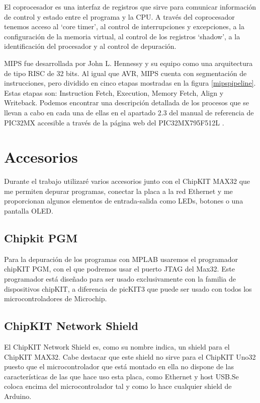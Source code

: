 El coprocesador es una interfaz de registros que sirve para comunicar información de control y estado entre el programa y la CPU. A través del coprocesador tenemos acceso al `core timer', al control de interrupciones y excepciones, a la configuración de la memoria virtual, al control de los registros `shadow', a la identificación del procesador y al control de depuración.


MIPS fue desarrollada por John L. Hennessy y su equipo como una arquitectura de tipo RISC de 32 bits. Al igual que AVR, MIPS cuenta con segmentación de instrucciones, pero dividido en cinco etapas mostradas en la figura \ref{mipspipeline}. Estas etapas son: Instruction Fetch, Execution, Memory Fetch, Align y Writeback. Podemos encontrar una descripción detallada de los procesos que se llevan a cabo en cada una de ellas en el apartado 2.3 del manual de referencia de PIC32MX accesible a través de la página web del PIC32MX795F512L \cite{website:pic32mx}.



\section{Accesorios}
Durante el trabajo utilizaré varios accesorios junto con el ChipKIT MAX32 que me permiten depurar programas, conectar la placa a la red Ethernet y me proporcionan algunos elementos de entrada-salida como LEDs, botones o una pantalla OLED.
\subsection{Chipkit PGM}
Para la depuración de los programas con MPLAB usaremos el programador chipKIT PGM\cite{website:pgm}, con el que podremos usar el puerto JTAG del Max32. Este programador está diseñado para ser usado exclusivamente con la familia de dispositivos chipKIT, a diferencia de picKIT3\cite{website:pickit} que puede ser usado con todos los microcontroladores de Microchip.


\subsection{ChipKIT Network Shield}

El ChipKIT Network Shield es, como su nombre indica, un shield para el ChipKIT MAX32. Cabe destacar que este shield no sirve para el ChipKIT Uno32 puesto que el microcontrolador que está montado en ella no dispone de las características de las que hace uso esta placa, como Ethernet y host USB.Se coloca encima del microcontrolador tal y como lo hace cualquier shield de Arduino.


